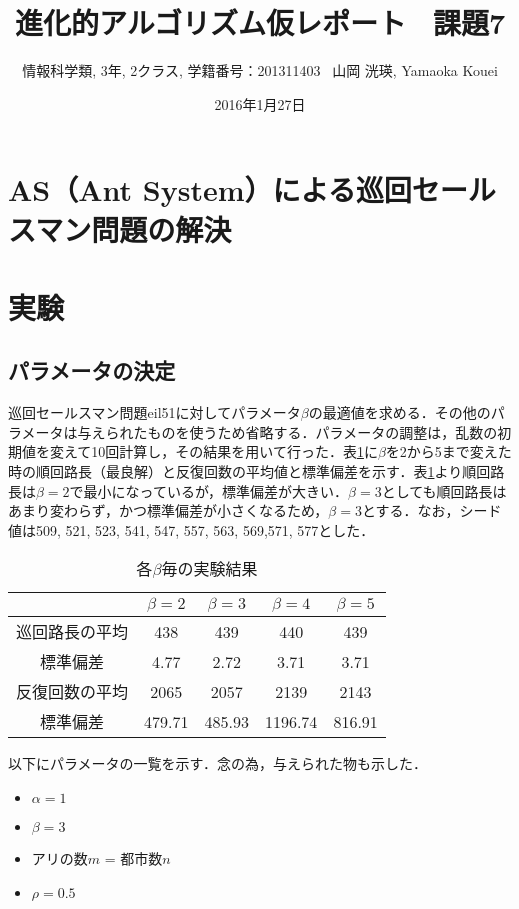 \documentclass[a4j]{jarticle}
\title{進化的アルゴリズム仮レポート \ 課題7}
\author{情報科学類, 3年, 2クラス, 学籍番号：201311403 \ 山岡 洸瑛, Yamaoka
Kouei}
\date{2016年1月27日}
\begin{document}
\maketitle

\section*{AS（Ant System）による巡回セールスマン問題の解決}
\section*{実験}
\subsection*{パラメータの決定}
巡回セールスマン問題eil51に対してパラメータ$\beta$の最適値を求める．その他のパラメータは与えられたものを使うため省略する．パラメータの調整は，乱数の初期値を変えて10回計算し，その結果を用いて行った．表\ref{beta}に$\beta$を2から5まで変えた時の順回路長（最良解）と反復回数の平均値と標準偏差を示す．表\ref{beta}より順回路長は$\beta=2$で最小になっているが，標準偏差が大きい．$\beta=3$としても順回路長はあまり変わらず，かつ標準偏差が小さくなるため，$\beta=3$とする．なお，シード値は{509, 521, 523, 541, 547, 557, 563, 569,571, 577}とした．
\begin{table}[H]
 \begin{center}
  \label{beta}
  \caption{各$\beta$毎の実験結果}
  \begin{tabular}[tb]{|c|c|c|c|c|}\hline
    &$ \beta = 2 $&$ \beta = 3 $&$ \beta = 4 $&$ \beta = 5 $\\\hline
巡回路長の平均 & 438 & 439 & 440 & 439 \\\hline
標準偏差 & 4.77 & 2.72 & 3.71 & 3.71 \\\hline
反復回数の平均 & 2065 & 2057 & 2139 & 2143 \\\hline
標準偏差 & 479.71 & 485.93 & 1196.74 & 816.91 \\\hline
  \end{tabular}
 \end{center}
\end{table}

\par 以下にパラメータの一覧を示す．念の為，与えられた物も示した．
\begin{itemize}
 \item $\alpha = 1$
 \item $\beta = 3$
 \item アリの数$m$ = 都市数$n$
 \item $\rho = 0.5$
\end{itemize}
\end{document}
